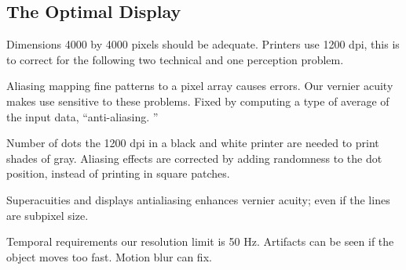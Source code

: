 \begin{mdframed}\begin{multicols}{2}
\subsection{The Optimal Display}
\begin{compactdesc}
\item[Dimensions] 4000 by 4000 pixels should be adequate. Printers use 1200
    dpi, this is to correct for the following two technical and one perception
    problem.
\item[Aliasing] mapping fine patterns to a pixel array causes errors. Our
    vernier acuity makes use sensitive to these problems. Fixed by computing
    a type of average of the input data, ``anti-aliasing. ''
\item[Number of dots] the 1200 dpi in a black and white printer are needed to
    print shades of gray. Aliasing effects are corrected by adding randomness
     to the dot position, instead of printing in square patches.
\item[Superacuities and displays] antialiasing enhances vernier acuity;
    even if the lines are subpixel size.
\item[Temporal requirements] our resolution limit is 50 Hz. Artifacts can be
    seen if the object moves too fast. Motion blur can fix.
\end{compactdesc}
\end{multicols}\end{mdframed}


